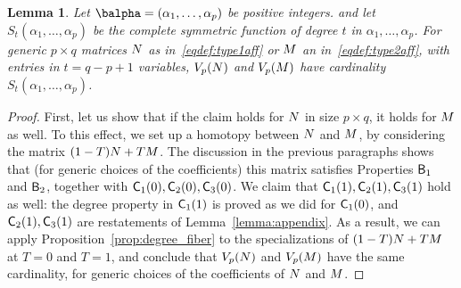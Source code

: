 \documentclass[12pt]{article}
\newtheorem{lemma}[definition]{Lemma}
\begin{document}
\begin{lemma}
  Let $\balpha=(\alpha_1,\dots,\alpha_p)$ be positive integers.  and
  let $S_{t}(\alpha_1,\dots,\alpha_p)$ be the complete symmetric
  function of degree $t$ in $\alpha_1,\dots,\alpha_p$. For generic $p
  \times q$ matrices ${N}$ as in~\eqref{eqdef:type1aff} or ${M}$ an
  in~\eqref{eqdef:type2aff}, with entries in $t=q-p+1$ variables,
$V_p({N})$ and $V_p({M})$ have
  cardinality $S_{t}(\alpha_1,\dots,\alpha_p)$.
\end{lemma}
\begin{proof}
  First, let us show that if the claim holds for ${N}$ in size $p
  \times q$, it holds for ${M}$ as well. To this effect, we set up a
  homotopy between ${N}$ and ${M}$, by considering the matrix
  $(1-T){N} + T{M}$.  The discussion in the previous paragraphs shows
  that (for generic choices of the coefficients) this matrix satisfies
  Properties $\mathsf{B}_1$ and $\mathsf{B}_2$, together with
  $\mathsf{C}_1(0),\mathsf{C}_2(0),\mathsf{C}_3(0)$.  We claim that
  $\mathsf{C}_1(1),\mathsf{C}_2(1),\mathsf{C}_3(1)$ hold as well: the degree property
  in $\mathsf{C}_1(1)$ is proved as we did for $\mathsf{C}_1(0)$, and
  $\mathsf{C}_2(1),\mathsf{C}_3(1)$ are restatements of
  Lemma~\ref{lemma:appendix}. As a result, we can apply
  Proposition~\ref{prop:degree_fiber} to the specializations of
  $(1-T){N} + T{M}$ at $T=0$ and $T=1$, and conclude that $V_p({N})$
  and $V_p({M})$ have the same cardinality, for generic choices of
  the coefficients of ${N}$ and ${M}$.


\end{proof}
\end{document}
